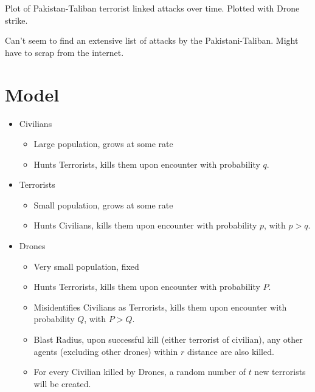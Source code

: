 \documentclass[12pt,letter,draft]{article}
\begin{document}
\begin{spacing}{1.5}









Plot of Pakistan-Taliban terrorist linked attacks over time. Plotted with Drone strike.

Can't seem to find an extensive list of attacks by the Pakistani-Taliban. Might have to scrap from the internet. 

\section{Model}

\begin{itemize}
\item Civilians
	\begin{itemize}
	\item Large population, grows at some rate 
	\item Hunts Terrorists, kills them upon encounter with probability $q$. 
	\end{itemize}
\item Terrorists 
	\begin{itemize}
	\item Small population, grows at some rate 
	\item Hunts Civilians, kills them upon encounter with probability $p$, with $p>q$.  
	\end{itemize}
\item Drones
	\begin{itemize}
	\item Very small population, fixed 
	\item Hunts Terrorists, kills them upon encounter with probability $P$.
	\item Misidentifies Civilians as Terrorists, kills them upon encounter with probability $Q$, with $P>Q$. 
	\item Blast Radius, upon successful kill (either terrorist of civilian), any other agents (excluding other drones) within $r$ distance are also killed.  
	\item For every Civilian killed by Drones, a random number of $t$ new terrorists will be created.
	\end{itemize}
\end{itemize}


\end{spacing}
\end{document}
